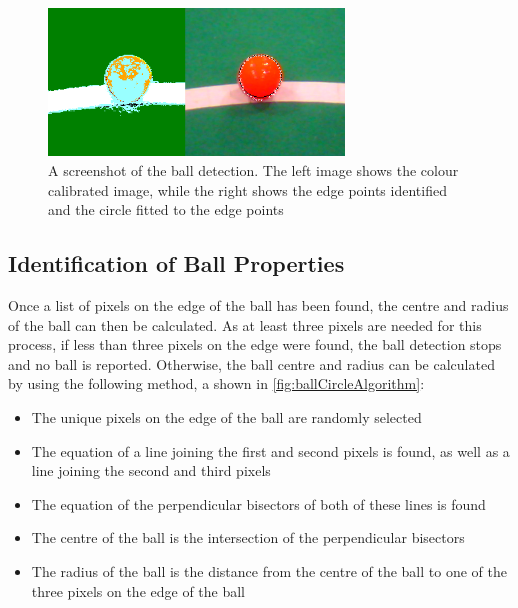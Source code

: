 \documentclass[pdftex,11pt,a4paper]{report}
\begin{document}
\begin{figure} [t]
\centering
\includegraphics[width=0.7\textwidth]{figures/ballDetectionScreenshot.png}
\caption{A screenshot of the ball detection. The left image shows the colour calibrated image, while the right shows the edge points identified and the circle fitted to the edge points} \label{fig:ballDetection}
\end{figure}

\subsection{Identification of Ball Properties}

Once a list of pixels on the edge of the ball has been found, the centre and radius of the ball can then be calculated. As at least three pixels are needed for this process, if less than three pixels on the edge were found, the ball detection stops and no ball is reported. Otherwise, the ball centre and radius can be calculated by using the following method, a shown in \autoref{fig:ballCircleAlgorithm}: \begin{itemize}
\item{The unique pixels on the edge of the ball are randomly selected}
\item{The equation of a line joining the first and second pixels is found, as well as a line joining the second and third pixels}
\item{The equation of the perpendicular bisectors of both of these lines is found}
\item{The centre of the ball is the intersection of the perpendicular bisectors}
\item{The radius of the ball is the distance from the centre of the ball to one of the three pixels on the edge of the ball}
\end{itemize}
\end{document}
